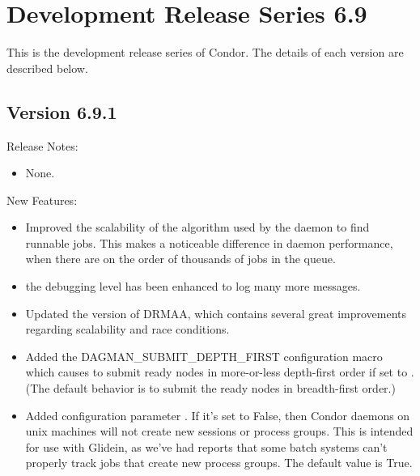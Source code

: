 \section{\label{sec:History-6-9}Development Release Series 6.9}

This is the development release series of Condor.
The details of each version are described below.

\subsection*{\label{sec:New-6-9-1}Version 6.9.1}

\noindent Release Notes:

\begin{itemize}

\item None.

\end{itemize}

\noindent New Features:

\begin{itemize}

\item Improved the scalability of the algorithm used by 
the  daemon to find runnable jobs.
This makes a noticeable difference in  daemon performance,
when there are on the order of thousands of jobs in the queue.

\item the  debugging level has been enhanced to
log many more messages. 

\item Updated the version of DRMAA, which contains several great
improvements regarding scalability and race conditions.

\item Added the DAGMAN\_SUBMIT\_DEPTH\_FIRST configuration macro which
causes  to submit ready nodes in more-or-less depth-first
order if set to .  (The default behavior is to submit
the ready nodes in breadth-first order.)

\item Added configuration parameter . If it's
set to False, then Condor daemons on unix machines will not create new 
sessions or process groups. This is intended for use with Glidein, as
we've had reports that some batch systems can't properly track jobs that
create new process groups. The default value is True.

\end{itemize}

